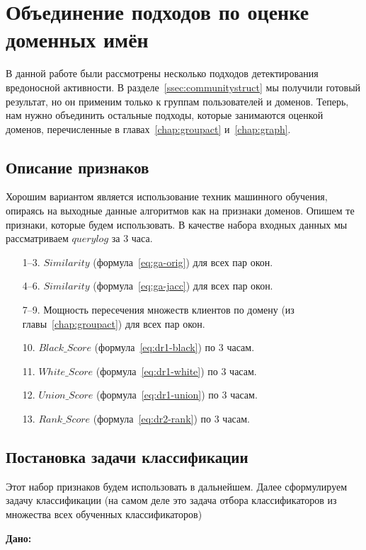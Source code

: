 \documentclass[a4paper,14pt]{extreport} %
\begin{document}
\chapter{Объединение подходов по оценке доменных имён}
\label{chap:union-all}
В данной работе были рассмотрены несколько подходов детектирования вредоносной активности. В разделе~\ref{ssec:communitystruct} мы получили готовый результат, но он применим только к группам пользователей и доменов. Теперь, нам нужно объединить остальные подходы, которые занимаются оценкой доменов, перечисленные в главах~\ref{chap:groupact} и~\ref{chap:graph}.
	
\section{Описание признаков}
\label{sec:desc-features}
Хорошим вариантом является использование техник машинного обучения, опираясь на выходные данные алгоритмов как на признаки доменов. Опишем те признаки, которые будем использовать. В качестве набора входных данных мы рассматриваем $querylog$ за 3 часа.
\begin{enumerate}
	\item [1--3.] $Similarity$ (формула~\eqref{eq:ga-orig}) для всех пар окон.
	\item [4--6.]$Similarity$ (формула~\eqref{eq:ga-jacc}) для всех пар окон.
	\item [7--9.] Мощность пересечения множеств клиентов по домену (из главы~\ref{chap:groupact}) для всех пар окон.
	\item [10.] $Black\_Score$ (формула~\eqref{eq:dr1-black}) по 3 часам.
	\item [11.] $White\_Score$ (формула~\eqref{eq:dr1-white}) по 3 часам.
	\item [12.] $Union\_Score$ (формула~\eqref{eq:dr1-union}) по 3 часам.
	\item [13.] $Rank\_Score$ (формула~\eqref{eq:dr2-rank}) по 3 часам.
	      	      	      		
\end{enumerate}
\section{Постановка задачи классификации}
Этот набор признаков будем использовать в дальнейшем. Далее сформулируем задачу классификации (на самом деле это задача отбора классификаторов из множества всех обученных классификаторов)
	
{\bf
	Дано:
}
\end{document}
